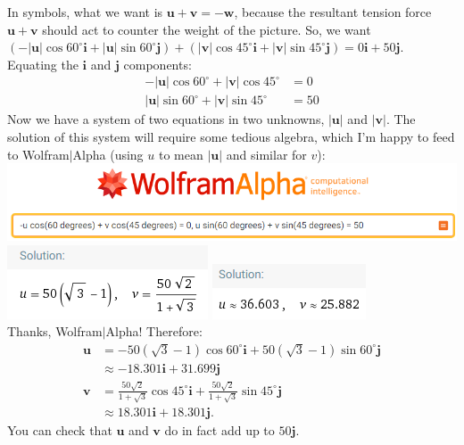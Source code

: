 \documentclass[10pt]{article}
\newcommand{\vu}{\mathbf{u}}
\newcommand{\vv}{\mathbf{v}}
\newcommand{\vw}{\mathbf{w}}
\newcommand{\vi}{\mathbf{i}}
\newcommand{\vj}{\mathbf{j}}
\newenvironment{red}{\color{red}}{\ignorespacesafterend}
\begin{document}
\begin{enumerate}[leftmargin=0pt]
\begin{enumerate}
        \begin{red}
        In symbols, what we want is $\vu + \vv = -\vw$, because the resultant tension force $\vu + \vv$ should act to counter the weight of the picture.
        So, we want $(-|\vu|\cos60^\circ \vi + |\vu|\sin60^\circ \vj) + (|\vv|\cos45^\circ \vi + |\vv|\sin45^\circ \vj) = 0 \vi + 50 \vj$. Equating the $\vi$ and $\vj$ components:
        \begin{align*}
            -|\vu|\cos60^\circ + |\vv|\cos45^\circ &= 0 \\
             |\vu|\sin60^\circ + |\vv|\sin45^\circ &= 50
        \end{align*}
        Now we have a system of two equations in two unknowns, $|\vu|$ and $|\vv|$. The solution of this system will require some tedious algebra, which I'm happy to feed to Wolfram$|$Alpha (using $u$ to mean $|\vu|$ and similar for $v$):
        \\
        \includegraphics[width=\linewidth]{wa-3-1.png} \\
        \includegraphics[width=0.4\linewidth]{wa-3-2.png}
        \includegraphics[width=0.4\linewidth]{wa-3-3.png}\\
        Thanks, Wolfram$|$Alpha! Therefore:
        \begin{align*}
            \vu &= - 50(\sqrt{3} - 1) \cos60^\circ \vi + 50(\sqrt{3} - 1) \sin60^\circ \vj\\
            &\approx -18.301 \vi + 31.699 \vj \\
            \vv &= \frac{50\sqrt{2}}{1+\sqrt{3}}\cos45^\circ\vi + \frac{50\sqrt{2}}{1+\sqrt{3}}\sin45^\circ\vj\\
            &\approx 18.301 \vi + 18.301 \vj.
        \end{align*}
        You can check that $\vu$ and $\vv$ do in fact add up to $50\vj$.
        \end{red}
    \end{enumerate}
    

\end{enumerate}
\end{document}
